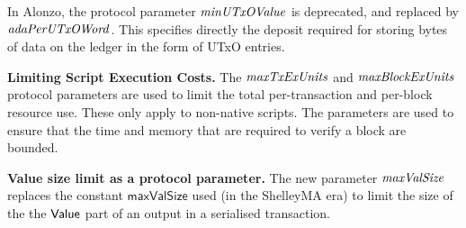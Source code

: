 In Alonzo, the protocol parameter $\mathit{minUTxOValue}$ is deprecated, and replaced by
$\mathit{adaPerUTxOWord}$. This specifies directly the deposit required for storing
bytes of data on the ledger in the form of UTxO entries.

\textbf{Limiting Script Execution Costs.}
The $\mathit{maxTxExUnits}$ and $\mathit{maxBlockExUnits}$ protocol parameters are
used to limit the total per-transaction and per-block resource use. These only apply to non-native scripts.
The parameters are used to ensure that the time and memory that are required to verify a block are bounded.

\textbf{Value size limit as a protocol parameter.}
The new parameter $\mathit{maxValSize}$ replaces the constant $\mathsf{maxValSize}$
used (in the ShelleyMA era) to limit the size of the the $\mathsf{Value}$ part of an output in a
serialised transaction.

